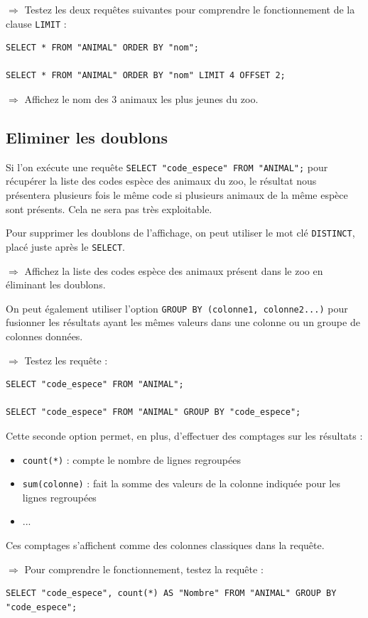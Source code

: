 \documentclass[11pt]{article}
\newcommand{\action}{$\Rightarrow$ }
\begin{document}
\action Testez les deux requêtes suivantes pour comprendre le fonctionnement de la clause \lstinline{LIMIT} :
\begin{lstlisting}
SELECT * FROM "ANIMAL" ORDER BY "nom";

SELECT * FROM "ANIMAL" ORDER BY "nom" LIMIT 4 OFFSET 2;
\end{lstlisting}

\action Affichez le nom des 3 animaux les plus jeunes du zoo.


\subsection{Eliminer les doublons}
Si l'on exécute une requête \lstinline{SELECT "code_espece" FROM "ANIMAL";} pour récupérer la liste des codes espèce des animaux du zoo, le résultat nous présentera plusieurs fois le même code si plusieurs animaux de la même espèce sont présents. Cela ne sera pas très exploitable.

Pour supprimer les doublons de l'affichage, on peut utiliser le mot clé \lstinline{DISTINCT}, placé juste après le \lstinline{SELECT}.

$\Rightarrow$ Affichez la liste des codes espèce des animaux présent dans le zoo en éliminant les doublons.

On peut également utiliser l'option \lstinline{GROUP BY (colonne1, colonne2...)} pour fusionner les résultats ayant les mêmes valeurs dans une colonne ou un groupe de colonnes données.

$\Rightarrow$ Testez les requête :
\begin{lstlisting}
SELECT "code_espece" FROM "ANIMAL";

SELECT "code_espece" FROM "ANIMAL" GROUP BY "code_espece";
\end{lstlisting}

Cette seconde option permet, en plus, d'effectuer des comptages sur les résultats :
\begin{itemize}
	\item \lstinline{count(*)} : compte le nombre de lignes regroupées
	\item \lstinline{sum(colonne)} : fait la somme des valeurs de la colonne indiquée pour les lignes regroupées
	\item ...
\end{itemize}
Ces comptages s'affichent comme des colonnes classiques dans la requête.

$\Rightarrow$ Pour comprendre le fonctionnement, testez la requête :
\begin{lstlisting}
SELECT "code_espece", count(*) AS "Nombre" FROM "ANIMAL" GROUP BY "code_espece";
\end{lstlisting}
\end{document}
